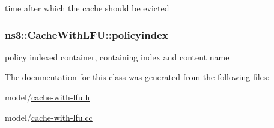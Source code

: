 time after which the cache should be evicted 

\hypertarget{classns3_1_1CacheWithLFU_ae17cdaaa0686b2fd2171d98ad767eec5}{
\subsubsection[{policyindex}]{ ns3\-::\-Cache\-With\-L\-F\-U\-::policyindex\hspace{0.3cm}{\ttfamily [private]}}}\label{classns3_1_1CacheWithLFU_ae17cdaaa0686b2fd2171d98ad767eec5}


policy indexed container, containing index and content name 



The documentation for this class was generated from the following files\-:\begin{DoxyCompactItemize}
\item 
model/\hyperlink{cache-with-lfu_8h}{cache-\/with-\/lfu.\-h}\item 
model/\hyperlink{cache-with-lfu_8cc}{cache-\/with-\/lfu.\-cc}\end{DoxyCompactItemize}
